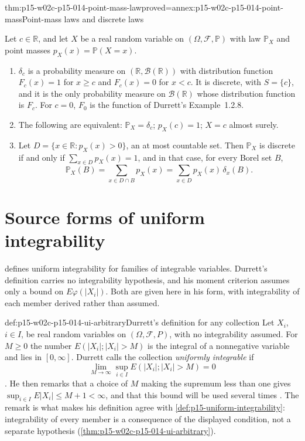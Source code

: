\begin{hblemma}{thm:p15-w02c-p15-014-point-mass-law}{proved=annex:p15-w02c-p15-014-point-mass}{Point-mass laws and discrete laws}
\par\nobreak
Let \(c\in\mathbb R\), and let \(X\) be a real random variable on
\((\Omega,\mathcal F,\mathbb P)\) with law \(\mathbb P_X\) and point
masses \(p_X(x)=\mathbb P(X=x)\).
\begin{enumerate}
\item \(\delta_c\) is a probability measure on
      \((\mathbb R,\mathcal B(\mathbb R))\) with distribution function
      \(F_c(x)=1\) for \(x\geq c\) and \(F_c(x)=0\) for \(x<c\). It is
      discrete, with \(S=\{c\}\), and it is the only probability measure
      on \(\mathcal B(\mathbb R)\) whose distribution function is
      \(F_c\). For \(c=0\), \(F_0\) is the function of Durrett's
      Example~1.2.8.
\item The following are equivalent: \(\mathbb P_X=\delta_c\);
      \(p_X(c)=1\); \(X=c\) almost surely.
\item Let \(D=\{x\in\mathbb R:p_X(x)>0\}\), an at most countable set.
      Then \(\mathbb P_X\) is discrete if and only if
      \(\sum_{x\in D}p_X(x)=1\), and in that case, for every Borel set
      \(B\),
      \[
       \mathbb P_X(B)=\sum_{x\in D\cap B}p_X(x)
                     =\sum_{x\in D}p_X(x)\,\delta_x(B).
      \]
\end{enumerate}
\end{hblemma}

\section{Source forms of uniform integrability}
\label{sec:p15-w02c-p15-014-ui-source}

 defines uniform integrability for
families of integrable variables. Durrett's definition carries no
integrability hypothesis, and his moment criterion assumes only a bound
on \(E\varphi(|X_i|)\). Both are given here in his form, with integrability
of each member derived rather than assumed.

\begin{hbconvention}{def:p15-w02c-p15-014-ui-arbitrary}{Durrett's definition for any collection}
Let \(X_i\), \(i\in I\), be real random variables on
\((\Omega,\mathcal F,P)\), with no integrability assumed. For
\(M\geq0\) the number \(E(|X_i|;|X_i|>M)\) is the integral of a
nonnegative variable and lies in \([0,\infty]\). Durrett calls the
collection \emph{uniformly integrable} if
\[
 \lim_{M\to\infty}\sup_{i\in I}E(|X_i|;|X_i|>M)=0
\]
\cite[sec.~4.6, p.~244]{DurrettPTEAuthor2019}. He then remarks that a
choice of \(M\) making the supremum less than one gives
\(\sup_{i\in I}E|X_i|\leq M+1<\infty\), and that this bound will be used
several times \cite[p.~244]{DurrettPTEAuthor2019}. The remark is what
makes his definition agree with \cref{def:p15-uniform-integrability}:
integrability of every member is a consequence of the displayed
condition, not a separate hypothesis
(\cref{thm:p15-w02c-p15-014-ui-arbitrary}).
\end{hbconvention}


